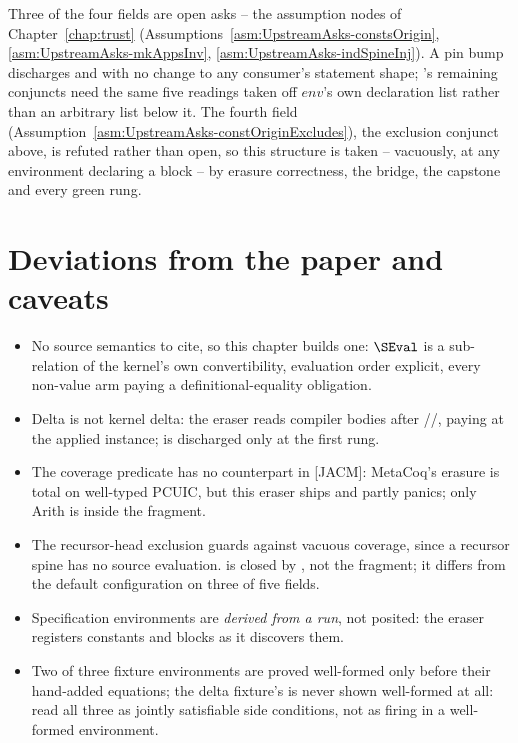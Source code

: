 \begin{remark}
\stAssumed{}  Three of the four fields are open asks -- the 
assumption nodes of Chapter~\ref{chap:trust} (Assumptions~\ref{asm:UpstreamAsks-constsOrigin},
\ref{asm:UpstreamAsks-mkAppsInv}, \ref{asm:UpstreamAsks-indSpineInj}). A pin bump discharges
 and  with no change to any consumer's statement shape;
's remaining conjuncts need the same five readings taken off $env$'s own
declaration list rather than an arbitrary list below it. The fourth field
(Assumption~\ref{asm:UpstreamAsks-constOriginExcludes}), the exclusion conjunct above, is refuted
rather than open, so this structure is taken -- vacuously, at any environment declaring a block --
by erasure correctness, the bridge, the capstone and every green rung.
\end{remark}

\section*{Deviations from the paper and caveats}

\begin{itemize}
\item {} No source semantics to cite, so this chapter builds one: $\SEval$ is a
sub-relation of the kernel's own convertibility, evaluation order explicit, every non-value arm
paying a definitional-equality obligation.
\item {} Delta is not kernel delta: the eraser reads compiler bodies after
//, paying  at the applied
instance;  is discharged only at the first rung.
\item {} The coverage predicate has no counterpart in [JACM]: MetaCoq's erasure is total
on well-typed PCUIC, but this eraser ships and partly panics; only Arith is inside the fragment.
\item {} The recursor-head exclusion guards against vacuous coverage, since a recursor
spine has no source evaluation.  is closed by , not
the fragment; it differs from the default  configuration on three of five fields.
\item {} Specification environments are  \emph{derived from a run},
not posited: the eraser registers constants and blocks as it discovers them.
\item {} Two of three fixture environments are proved well-formed only before their
hand-added equations; the delta fixture's is never shown well-formed at all: read all three as
jointly satisfiable side conditions, not as firing in a well-formed environment.
\end{itemize}
